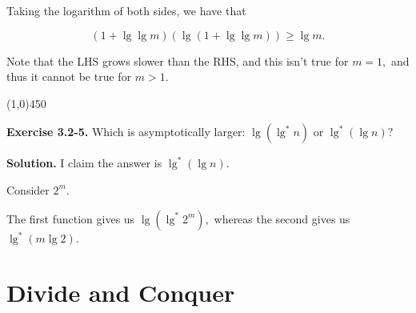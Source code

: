 \documentclass{article}
\newcommand{\exec}[2]
{\textbf{Exercise #1.} #2

\textbf{Solution.}}
\newcommand{\bardiv}{\begin{center}
\line(1,0){450}
\end{center}}
\begin{document}
Taking the logarithm of both sides, we have that

$$(1+\lg\lg m)(\lg(1+\lg\lg m)) \geq \lg m.$$

Note that the LHS grows slower than the RHS, and this isn't true for $m=1,$ and thus it cannot be true for $m > 1.$

\bardiv

\exec{3.2-5}{Which is asymptotically larger: $\lg(\lg^* n)$ or $\lg^* (\lg n)?$}
I claim the answer is $\lg^* (\lg n).$ 

Consider $2^m.$ 

The first function gives us $\lg(\lg^* 2^m),$ whereas the second gives us $\lg^*(m\lg 2).$

\section{Divide and Conquer}
\end{document}
